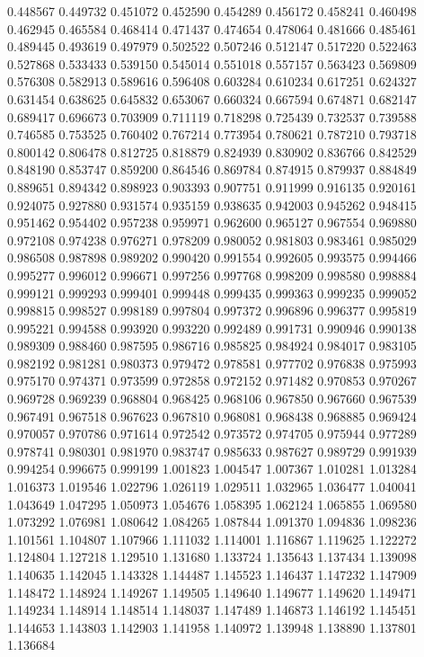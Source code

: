 0.448567
0.449732
0.451072
0.452590
0.454289
0.456172
0.458241
0.460498
0.462945
0.465584
0.468414
0.471437
0.474654
0.478064
0.481666
0.485461
0.489445
0.493619
0.497979
0.502522
0.507246
0.512147
0.517220
0.522463
0.527868
0.533433
0.539150
0.545014
0.551018
0.557157
0.563423
0.569809
0.576308
0.582913
0.589616
0.596408
0.603284
0.610234
0.617251
0.624327
0.631454
0.638625
0.645832
0.653067
0.660324
0.667594
0.674871
0.682147
0.689417
0.696673
0.703909
0.711119
0.718298
0.725439
0.732537
0.739588
0.746585
0.753525
0.760402
0.767214
0.773954
0.780621
0.787210
0.793718
0.800142
0.806478
0.812725
0.818879
0.824939
0.830902
0.836766
0.842529
0.848190
0.853747
0.859200
0.864546
0.869784
0.874915
0.879937
0.884849
0.889651
0.894342
0.898923
0.903393
0.907751
0.911999
0.916135
0.920161
0.924075
0.927880
0.931574
0.935159
0.938635
0.942003
0.945262
0.948415
0.951462
0.954402
0.957238
0.959971
0.962600
0.965127
0.967554
0.969880
0.972108
0.974238
0.976271
0.978209
0.980052
0.981803
0.983461
0.985029
0.986508
0.987898
0.989202
0.990420
0.991554
0.992605
0.993575
0.994466
0.995277
0.996012
0.996671
0.997256
0.997768
0.998209
0.998580
0.998884
0.999121
0.999293
0.999401
0.999448
0.999435
0.999363
0.999235
0.999052
0.998815
0.998527
0.998189
0.997804
0.997372
0.996896
0.996377
0.995819
0.995221
0.994588
0.993920
0.993220
0.992489
0.991731
0.990946
0.990138
0.989309
0.988460
0.987595
0.986716
0.985825
0.984924
0.984017
0.983105
0.982192
0.981281
0.980373
0.979472
0.978581
0.977702
0.976838
0.975993
0.975170
0.974371
0.973599
0.972858
0.972152
0.971482
0.970853
0.970267
0.969728
0.969239
0.968804
0.968425
0.968106
0.967850
0.967660
0.967539
0.967491
0.967518
0.967623
0.967810
0.968081
0.968438
0.968885
0.969424
0.970057
0.970786
0.971614
0.972542
0.973572
0.974705
0.975944
0.977289
0.978741
0.980301
0.981970
0.983747
0.985633
0.987627
0.989729
0.991939
0.994254
0.996675
0.999199
1.001823
1.004547
1.007367
1.010281
1.013284
1.016373
1.019546
1.022796
1.026119
1.029511
1.032965
1.036477
1.040041
1.043649
1.047295
1.050973
1.054676
1.058395
1.062124
1.065855
1.069580
1.073292
1.076981
1.080642
1.084265
1.087844
1.091370
1.094836
1.098236
1.101561
1.104807
1.107966
1.111032
1.114001
1.116867
1.119625
1.122272
1.124804
1.127218
1.129510
1.131680
1.133724
1.135643
1.137434
1.139098
1.140635
1.142045
1.143328
1.144487
1.145523
1.146437
1.147232
1.147909
1.148472
1.148924
1.149267
1.149505
1.149640
1.149677
1.149620
1.149471
1.149234
1.148914
1.148514
1.148037
1.147489
1.146873
1.146192
1.145451
1.144653
1.143803
1.142903
1.141958
1.140972
1.139948
1.138890
1.137801
1.136684
